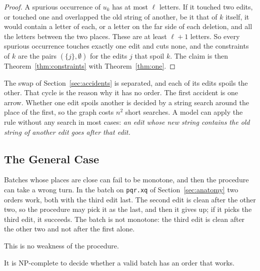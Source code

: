 \documentclass[acmsmall,nonacm,screen]{acmart}
\newcommand{\str}[1]{\texttt{#1}}
\newcommand{\claim}[2]{#2}
\begin{document}
\begin{proof}
A spurious occurrence of $u_k$ has at most $\ell$ letters. If it touched two edits, or
touched one and overlapped the old string of another, be it that of $k$ itself, it would
contain a letter of each, or a letter on the far side
of each deletion, and all the letters between the two places. These are at least $\ell + 1$
letters. So every spurious occurrence touches exactly one edit and cuts none, and the
constraints of $k$ are the pairs $(\{j\}, \emptyset)$ for the edits $j$ that spoil $k$. The
claim is then Theorem~\ref{thm:constraints} with Theorem~\ref{thm:one}.
\end{proof}

The swap of Section~\ref{sec:accidents} is separated, and each of its edits spoils the other.
That cycle is the reason why it has no order. The first accident is one arrow. Whether one
edit spoils another is decided by a string search around the place of the first, so the graph
costs $n^2$ short searches. A model can apply the rule without any search in most cases:
\emph{an edit whose new string contains the old string of another edit goes after that
edit.}

\subsection{The General Case}

Batches whose places are close can fail to be monotone, and then the procedure can take a
wrong turn. \claim{stuck}{In the batch on \str{pqr.xq} of Section~\ref{sec:anatomy} two
orders work, both with the third edit last. The second edit is clean after the other two, so
the procedure may pick it as the last, and then it gives up; if it picks the third edit, it
succeeds.} The batch is not monotone: the third edit is clean after the other two and not
after the first alone.

This is no weakness of the procedure.

\begin{theorem}[Hardness]\label{thm:hard}
It is NP-complete to decide whether a valid batch has an order that works.
\end{theorem}
\end{document}
